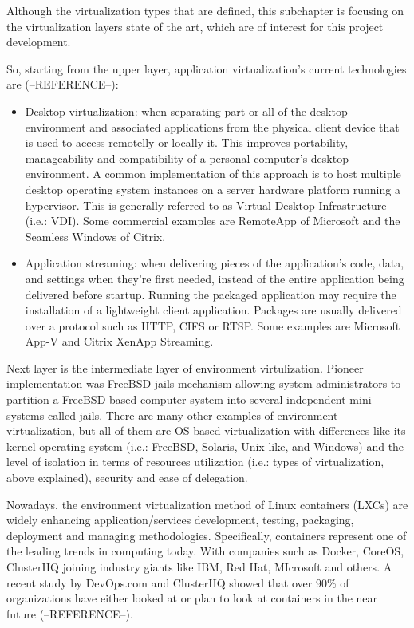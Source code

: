 Although the virtualization types that are defined, this subchapter is focusing on the virtualization layers state of the art, which are of interest for this project development.

So, starting from the upper layer, application virtualization's current technologies are (--REFERENCE--):

\begin{itemize}
\item Desktop virtualization: when separating part or all of the desktop environment and associated applications from the physical client device that is used to access remotelly or locally it. This improves portability, manageability and compatibility of a personal computer's desktop environment. A common implementation of this approach is to host multiple desktop operating system instances on a server hardware platform running a hypervisor. This is generally referred to as Virtual Desktop Infrastructure (i.e.: VDI). Some commercial examples are RemoteApp of Microsoft and the Seamless Windows of Citrix. 
\item Application streaming: when delivering pieces of the application's code, data, and settings when they're first needed, instead of the entire application being delivered before startup. Running the packaged application may require the installation of a lightweight client application. Packages are usually delivered over a protocol such as HTTP, CIFS or RTSP. Some examples are Microsoft App-V and Citrix XenApp Streaming.
\end{itemize}

Next layer is the intermediate layer of environment virtulization. Pioneer implementation was FreeBSD jails mechanism allowing system administrators to partition a FreeBSD-based computer system into several independent mini-systems called jails. There are many other examples of environment virtualization, but all of them are OS-based virtualization with differences like its kernel operating system (i.e.: FreeBSD, Solaris, Unix-like, and Windows) and the level of isolation in terms of resources utilization (i.e.: types of virtualization, above explained), security and ease of delegation. 

Nowadays, the environment virtualization method of Linux containers (LXCs) are widely enhancing application/services development, testing, packaging, deployment and managing methodologies. Specifically, containers represent one of the leading trends in computing today. With companies such as Docker, CoreOS, ClusterHQ joining industry giants like IBM, Red Hat, MIcrosoft and others. A recent study by DevOps.com and ClusterHQ showed that over 90\% of organizations have either looked at or plan to look at containers in the near future (--REFERENCE--).

